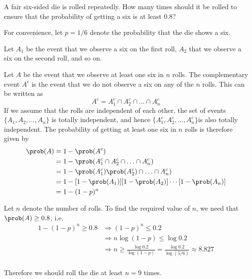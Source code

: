 \begin{exercise}
\begin{questions}
\question
A fair six-sided die is rolled repeatedly. How many times should it be rolled to ensure that the probability of getting a six is at least 0.8?

\begin{answer}
For convenience, let $p=1/6$ denote the probability that the die shows a six.
\par
Let $A_1$ be the event that we observe a six on the first roll, $A_2$ that we observe a six on the second roll, and so on. 
\par
Let $A$ be the event that we observe at least one six in $n$ rolls. The complementary event $A^c$ is the event that we do not observe a six on any of the $n$ rolls. This can be written as
\[
A^c = A_1^c\cap A_2^c\cap\ldots\cap A_n^c
\]
If we assume that the rolls are independent of each other, the set of events $\{A_1,A_2,\ldots,A_n\}$ is totally independent, and hence $\{A_1^c,A_2^c,\ldots,A_n^c\}$is also totally independent. The probability of getting at least one six in $n$ rolls is therefore given by 
\begin{align*}
\prob(A) 
	& = 1 - \prob(A^c) \\
	& = 1 - \prob(A_1^c\cap A_2^c\cap\ldots\cap A_n^c) \\
	& = 1 - \prob(A_1^c)\prob(A_2^c)\cap\ldots\cap A_n^c) \\
	& = 1 - [1-\prob(A_1)][1-\prob(A_2)]\cdots[1-\prob(A_n)] \\
	& = 1 - (1-p)^n \\
\end{align*}

Let $n$ denote the number of rolls. To find the required value of $n$, we need that $\prob(A)\geq 0.8$, i.e.\
\begin{align*}
1-(1-p)^n \geq 0.8	
	& \Rightarrow (1-p)^n \leq 0.2 \\
	& \Rightarrow n\log (1-p) \leq \log 0.2 \\
	& \Rightarrow n\geq \frac{\log 0.2}{\log(1-p)} = \frac{\log 0.2}{\log(5/6)} \approx 8.827 \\
\end{align*}

Therefore we should roll the die at least $n=9$ times.
\end{answer}


\end{questions}
\end{exercise}
